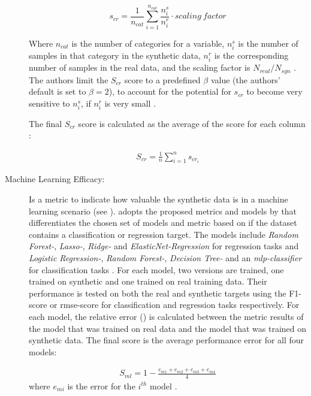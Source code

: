 \begin{description}
  $$ s_{cr} = \frac{1}{n_{cat}} \sum_{i=1}^{n_{cat}} \frac{n^s_i}{n^r_i} \cdot scaling~factor $$

  Where $n_{cat}$ is the number of categories for a variable, $n^s_i$ is the number of samples in that category in the synthetic data, $n^r_i$ is the corresponding number of samples in the real data, and the scaling factor is $N_{real}/N_{syn}$ \cite{chundawat2022UniversalMetricRobust}.
  The authors limit the $S_{cr}$ score to a predefined $\beta$ value (the authors' default is set to $\beta=2$), to account for the potential for $s_{cr}$ to become very sensitive to $n^s_i$, if $n^r_i$ is very small \cite{chundawat2022UniversalMetricRobust}.

  The final $S_{cr}$ score is calculated as the average of the score for each column \cite{chundawat2022UniversalMetricRobust}:

  \begin{equation}
    \begin{align*}
      \label{eqn:s_cr}
      S_{cr} = \frac{1}{n} \sum_{i=1}^{n} s_{cr_i}
      \end{align*}
  \end{equation}



  \item[Machine Learning Efficacy:]
  Is a metric to indicate how valuable the synthetic data is in a machine learning scenario (see ).
  \cite{chundawat2022UniversalMetricRobust} adopts the proposed metrics and models by \cite{brenninkmeijer2019GenerationEvaluationTabular} that differentiates the chosen set of models and metric based on
  if the dataset contains a classification or regression target.
  The models include \textit{Random Forest-}, \textit{Lasso-}, \textit{Ridge-} and \textit{ElasticNet-Regression} for regression tasks and \textit{Logistic Regression-}, \textit{Random Forest-},  \textit{Decision Tree-} and an \textit{\gls{mlp}-classifier} for classification tasks \cite{brenninkmeijer2019GenerationEvaluationTabular, chundawat2022UniversalMetricRobust}.
  For each model, two versions are trained, one trained on synthetic and one trained on real training data.
  Their performance is tested on both the real and synthetic targets using the F1-score or \gls{rmse}-score for classification and regression tasks respectively.
  For each model, the relative error () is calculated between the metric results of the model that was trained on real data and the model that was trained on synthetic data.
  The final score is the average performance error for all four models:

  \begin{equation}
    \begin{align*}
      \label{eqn:s_ml}
      S_{ml} = 1-\frac{e_{m1}+e_{m2}+e_{m3}+e_{m4}}{4}
      \end{align*}
  \end{equation}
  where $e_{mi}$ is the error for the $i^{th}$ model \cite{chundawat2022UniversalMetricRobust}.
\end{description}

